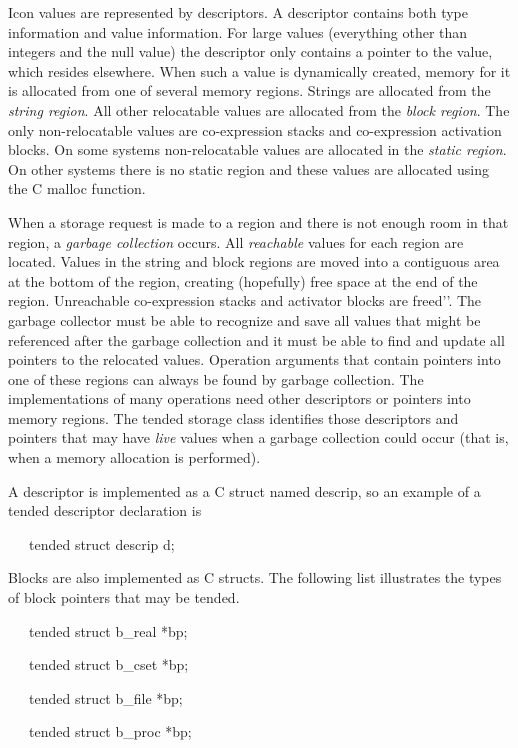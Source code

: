 Icon values are represented by descriptors. A descriptor contains both
type information and value information. For large values (everything
other than integers and the null value) the descriptor only contains a
pointer to the value, which resides elsewhere. When such a value is
dynamically created, memory for it is allocated from one of several
memory regions. Strings are allocated from the \textit{string
region}. All other relocatable values are allocated from the
\textit{block region}. The only non-relocatable values are
co-expression stacks and co-expression activation blocks. On some
systems non-relocatable values are allocated in the \textit{static
region}. On other systems there is no static region and these values
are allocated using the C malloc function.

When a storage request is made to a region and there is not enough
room in that region, a \textit{garbage collection} occurs. All
\textit{reachable} values for each region are located. Values in the
string and block regions are moved into a contiguous area at the
bottom of the region, creating (hopefully) free space at the end of
the region.  Unreachable co-expression stacks and activator blocks are
{\textasciigrave}{\textasciigrave}freed'{}'. The garbage collector
must be able to recognize and save all values that might be referenced
after the garbage collection and it must be able to find and update
all pointers to the relocated values. Operation arguments that contain
pointers into one of these regions can always be found by garbage
collection. The implementations of many operations need other
descriptors or pointers into memory regions. The tended storage class
identifies those descriptors and pointers that may have \textit{live}
values when a garbage collection could occur (that is, when a memory
allocation is performed).

A descriptor is implemented as a C struct named descrip, so an example
of a tended descriptor declaration is

{\ttfamily\mdseries
\ \ \ tended struct descrip d;}

Blocks are also implemented as C structs. The following list
illustrates the types of block pointers that may be tended.


{\ttfamily\mdseries
\ \ \ tended struct b\_real *bp;}

{\ttfamily\mdseries
\ \ \ tended struct b\_cset *bp;}

{\ttfamily\mdseries
\ \ \ tended struct b\_file *bp;}

{\ttfamily\mdseries
\ \ \ tended struct b\_proc *bp;}

